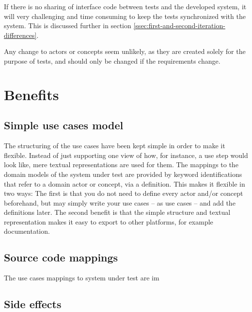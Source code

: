 \noindent If there is no sharing of interface code between tests and the developed system, it will very challenging and time consuming to keep the tests synchronized with the system. This is discussed further in section \ref{ssec:first-and-second-iteration-differences}.\medskip

\noindent Any change to actors or concepts seem unlikely, as they are created solely for the purpose of tests, and should only be changed if the requirements change.

\section{Benefits}

\subsection{Simple use cases model}
The structuring of the use cases have been kept simple in order to make it flexible. Instead of just supporting one view of how, for instance, a use step would look like, mere textual representations are used for them. The mappings to the domain models of the system under test are provided by keyword identifications that refer to a domain actor or concept, via a definition. This makes it flexible in two ways: The first is that you do not need to define every actor and/or concept beforehand, but may simply write your use cases -- as use cases -- and add the definitions later. The second benefit is that the simple structure and textual representation makes it easy to export to other platforms, for example documentation.

\subsection{Source code mappings}
The use cases mappings to system under test are im

\subsection{Side effects}

